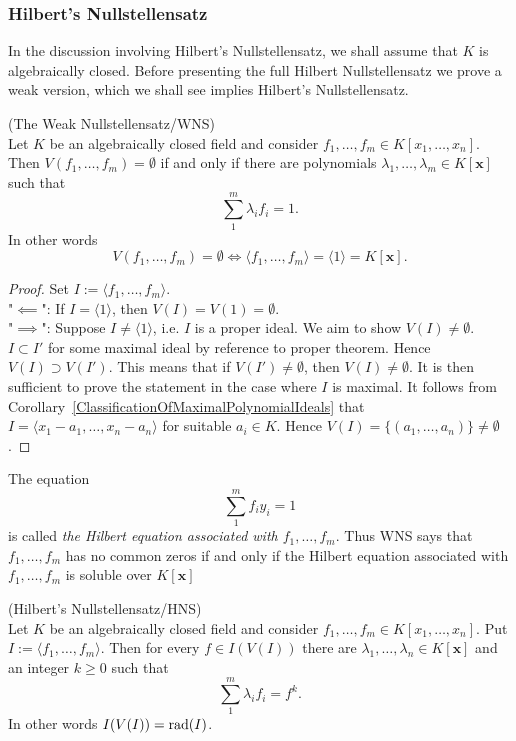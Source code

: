 \begin{example}
\begin{enumerate}
    \end{enumerate}
\end{example}
\subsubsection{Hilbert's Nullstellensatz}
In the discussion involving Hilbert's Nullstellensatz, we shall assume that $K$ is algebraically closed. Before presenting the full Hilbert Nullstellensatz we prove a weak version, which we shall see implies Hilbert's Nullstellensatz. 
\begin{theorem}(The Weak Nullstellensatz/WNS)\\
Let $K$ be an algebraically closed field and consider $f_1,\dots,f_m\in K[x_1,\dots,x_n]$. Then $V(f_1,\dots,f_m)=\emptyset$ if and only if there are polynomials $\lambda_1,\dots,\lambda_m\in K[\mathbf{x}]$ such that 
$$\sum_1^m \lambda_if_i = 1.$$
In other words 
$$V(f_1,\dots,f_m) = \emptyset \iff \langle f_1,\dots,f_m\rangle = \langle 1 \rangle = K[\mathbf{x}].$$
\end{theorem}
\begin{proof}
    Set $I:=\langle f_1,\dots,f_m\rangle$.\\
    "$\impliedby$": If $I = \langle 1\rangle $, then $V(I) = V(1) = \emptyset$.\\
    "$\implies$": Suppose $I\neq \langle 1 \rangle$, i.e. $I$ is a proper ideal. We aim to show $V(I)\neq \emptyset$. $I\subset I'$ for some maximal ideal {\large by reference to proper theorem}. Hence $V(I)\supset V(I')$. This means that if $V(I')\neq \emptyset$, then $V(I)\neq \emptyset$. It is then sufficient to prove the statement in the case where $I$ is maximal. It follows from Corollary~\ref{ClassificationOfMaximalPolynomialIdeals} that $I = \langle x_1-a_1,\dots,x_n-a_n\rangle$ for suitable $a_i\in K$. Hence $V(I) = \{(a_1,\dots,a_n)\}\neq \emptyset$.
\end{proof}
\begin{remark}
    The equation
    \begin{equation}\label{HilbertEquation}
        \sum_1^m f_iy_i = 1
    \end{equation}
    is called \textit{the Hilbert equation associated with $f_1,\dots,f_m$}. Thus WNS says that $f_1,\dots,f_m$ has no common zeros if and only if the Hilbert equation associated with $f_1,\dots,f_m$ is soluble over $K[\mathbf{x}]$
\end{remark}
\begin{theorem}(Hilbert's Nullstellensatz/HNS)\\  
    Let $K$ be an algebraically closed field and consider $f_1,\dots,f_m\in K[x_1,\dots,x_n]$. Put $I:= \langle f_1,\dots,f_m\rangle$. Then for every $f\in I(V(I))$ there are $\lambda_1,\dots,\lambda_n\in K[\mathbf{x}]$ and an integer $k\geq 0$ such that 
    $$\sum_1^m \lambda_if_i = f^k.$$
    In other words $I(V(I)) = \mathrm{rad}(I)$.
\end{theorem}
